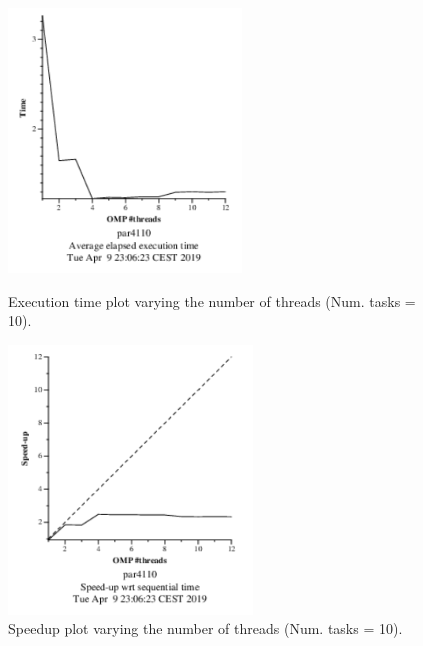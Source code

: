 \documentclass[12pt, a4paper]{article}
\begin{document}
\begin{figure}[H]
\centering
\begin{minipage}[b]{0.4\linewidth}
  \centering
  \includegraphics[scale=1.5]{./mandel-omp-10000-strong-omp-3-10-time}
  \caption{Execution time plot varying the number of threads (Num. tasks = 10).}
  \label{fig:mandel-omp-10000-strong-omp-3-10-time}
\end{minipage}%
\hspace{0.5cm}
\begin{minipage}[b]{0.4\linewidth}
  \centering
  \includegraphics[scale=1.5]{./mandel-omp-10000-strong-omp-3-10-speedup}
  \caption{Speedup plot varying the number of threads (Num. tasks = 10).}
  \label{fig:mandel-omp-10000-strong-omp-3-10-speedup}
\end{minipage}
\end{figure}
\end{document}
